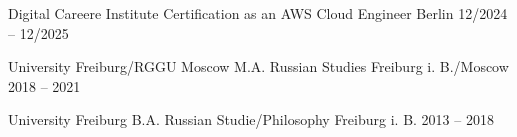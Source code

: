 
\begin{cventries}

  \cventry
  {Digital Careere Institute} %
  {Certification as an AWS Cloud Engineer} %
  {Berlin} %
  {12/2024 – 12/2025} %
  {}
  \vspace{2.0mm}

  \cventry
  {University Freiburg/RGGU Moscow} %
  {M.A. Russian Studies} %
  {Freiburg i. B./Moscow} %
  {2018 – 2021} %
  {}
  \vspace{2.0mm}

  \cventry
  {University Freiburg} %
  {B.A. Russian Studie/Philosophy} %
  {Freiburg i. B.} %
  {2013 – 2018} %
  {}

\end{cventries}
